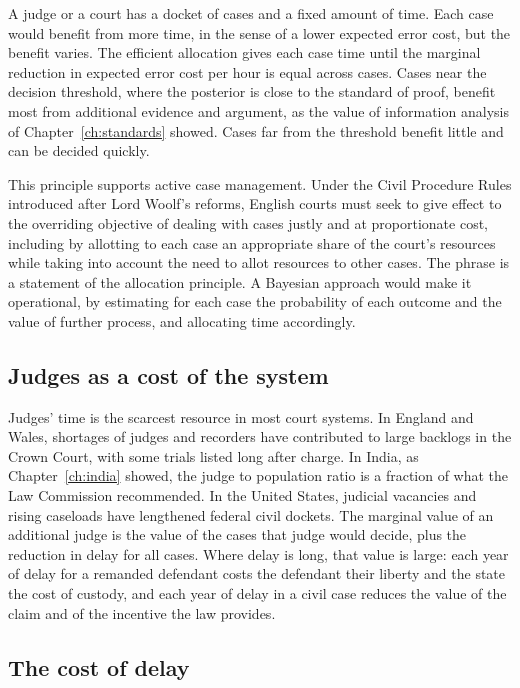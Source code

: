 A judge or a court has a docket of cases and a fixed amount of time. Each case would benefit from more time, in the sense of a lower expected error cost, but the benefit varies. The efficient allocation gives each case time until the marginal reduction in expected error cost per hour is equal across cases. Cases near the decision threshold, where the posterior is close to the standard of proof, benefit most from additional evidence and argument, as the value of information analysis of Chapter~\ref{ch:standards} showed. Cases far from the threshold benefit little and can be decided quickly.

This principle supports active case management. Under the Civil Procedure Rules introduced after Lord Woolf's reforms, English courts must seek to give effect to the overriding objective of dealing with cases justly and at proportionate cost, including by allotting to each case an appropriate share of the court's resources while taking into account the need to allot resources to other cases. The phrase is a statement of the allocation principle. A Bayesian approach would make it operational, by estimating for each case the probability of each outcome and the value of further process, and allocating time accordingly.

\subsection{Judges as a cost of the system}

Judges' time is the scarcest resource in most court systems. In England and Wales, shortages of judges and recorders have contributed to large backlogs in the Crown Court, with some trials listed long after charge. In India, as Chapter~\ref{ch:india} showed, the judge to population ratio is a fraction of what the Law Commission recommended. In the United States, judicial vacancies and rising caseloads have lengthened federal civil dockets. The marginal value of an additional judge is the value of the cases that judge would decide, plus the reduction in delay for all cases. Where delay is long, that value is large: each year of delay for a remanded defendant costs the defendant their liberty and the state the cost of custody, and each year of delay in a civil case reduces the value of the claim and of the incentive the law provides.

\subsection{The cost of delay}

